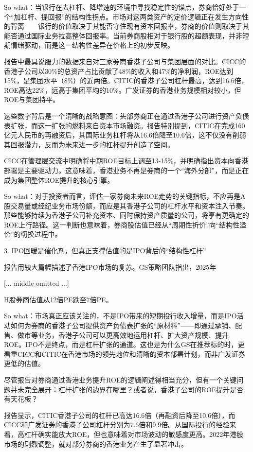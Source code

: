 \documentclass[11pt]{ctexart}
\begin{document}
So what：当银行在去杠杆、降增速的环境中寻找稳定性的锚点，券商恰好处于一个“加杠杆、提回报”的结构性拐点。市场对这两类资产的定价逻辑正在发生方向性的背离——银行的价值取决于其能否守住现有资本回报率，券商的价值则取决于其能否通过国际业务拉高整体回报率。当前券商股相对于银行股的超额表现，并非短期情绪驱动，而是这一结构性差异在价格上的初步反映。

报告中最具说服力的数据来自对三家券商香港子公司与集团层面的对比。CICC的香港子公司以30\%的总资产占比贡献了48\%的收入和47\%的净利润，ROE达到15\%，是集团水平（8\%）的近两倍。CITIC的香港子公司杠杆最高，达到16.6倍，ROE高达22\%，远高于集团平均的10\%。广发证券的香港业务规模相对较小，但ROE与集团持平。

这些数字背后是一个清晰的战略意图：头部券商正在通过香港子公司进行资产负债表扩张，而这一扩张的燃料来自资本市场融资。报告特别提到，CITIC在完成160亿元人民币的再融资后，其国际业务杠杆将从16.6倍降至10.6倍，这不仅没有削弱其回报潜力，反而为未来进一步的杠杆提升创造了空间。

CICC在管理层交流中明确将中期ROE目标上调至13-15\%，并明确指出资本向香港部署是主要驱动力。这意味着，香港业务不再是券商的一个“海外分部”，而是正在成为集团整体ROE提升的核心引擎。

So what：对于投资者而言，评估一家券商未来ROE走势的关键指标，不应再是A股交易量或经纪业务市场份额，而应是其香港子公司的杠杆水平和资本注入节奏。那些能够持续为香港子公司补充资本、同时保持资产质量的公司，将享有更确定的ROE上行路径。这一判断也意味着，券商股估值已经从“周期性折价”向“结构性溢价”的切换过程中。

3. IPO回暖是催化剂，但真正支撑估值的是IPO背后的“结构性杠杆”

报告用较大篇幅描述了香港IPO市场的复苏。GS策略团队指出，2025年

[... middle omitted ...]

H股券商估值从12倍PE跌至7倍PE。

So what：市场真正应该关注的，不是IPO带来的短期投行收入增量，而是IPO活动如何为券商的香港子公司提供资产负债表扩张的“原材料”——即通过承销、配售、做市等业务，香港子公司可以更高效地运用杠杆、扩大资产规模、提升ROE。IPO不是终点，而是杠杆扩张的通道。这也是为什么GS在推荐标的时，更看重CICC和CITIC在香港市场的领先地位和清晰的资本部署计划，而非广发证券更低的估值。

尽管报告对券商通过香港业务提升ROE的逻辑阐述得相当充分，但有一个关键问题并未完全展开：杠杆扩张的边界在哪里？或者说，香港子公司的ROE提升是否有天花板？

报告显示，CITIC香港子公司的杠杆已高达16.6倍（再融资后降至10.6倍），而CICC和广发证券的香港子公司杠杆分别为7.6倍和9.9倍。从国际投行的经验来看，高杠杆确实能放大ROE，但也意味着对市场波动的敏感度更高。2022年港股市场的剧烈调整，就对部分券商的香港业务产生了显著冲击。
\end{document}
